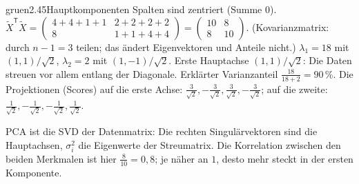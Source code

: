 \begin{loesungkarte}{gruen}{2.45}{Hauptkomponenten}
Spalten sind zentriert (Summe $0$). $\tilde X^{\mathsf T}\tilde X = \begin{pmatrix}4 + 4 + 1 + 1 & 2 + 2 + 2 + 2\\ 8 & 1 + 1 + 4 + 4\end{pmatrix} = \begin{pmatrix}10 & 8\\ 8 & 10\end{pmatrix}$. (Kovarianzmatrix: durch $n - 1 = 3$ teilen; das ändert Eigenvektoren und Anteile nicht.)
$\lambda_1 = 18$ mit $(1, 1)/\sqrt2$, $\lambda_2 = 2$ mit $(1, -1)/\sqrt2$.
Erste Hauptachse $(1, 1)/\sqrt2$: Die Daten streuen vor allem entlang der Diagonale. Erklärter Varianzanteil $\frac{18}{18 + 2} = 90\,\%$. Die Projektionen (Scores) auf die erste Achse: $\frac{3}{\sqrt2}, -\frac3{\sqrt2}, \frac3{\sqrt2}, -\frac3{\sqrt2}$; auf die zweite: $\frac1{\sqrt2}, -\frac1{\sqrt2}, -\frac1{\sqrt2}, \frac1{\sqrt2}$.
\begin{mitnehmen}\kastentext
PCA ist die SVD der Datenmatrix: Die rechten Singulärvektoren sind die Hauptachsen, $\sigma_i^{2}$ die Eigenwerte der Streumatrix. Die Korrelation zwischen den beiden Merkmalen ist hier $\frac8{10} = 0{,}8$; je näher an $1$, desto mehr steckt in der ersten Komponente.
\end{mitnehmen}
\end{loesungkarte}

